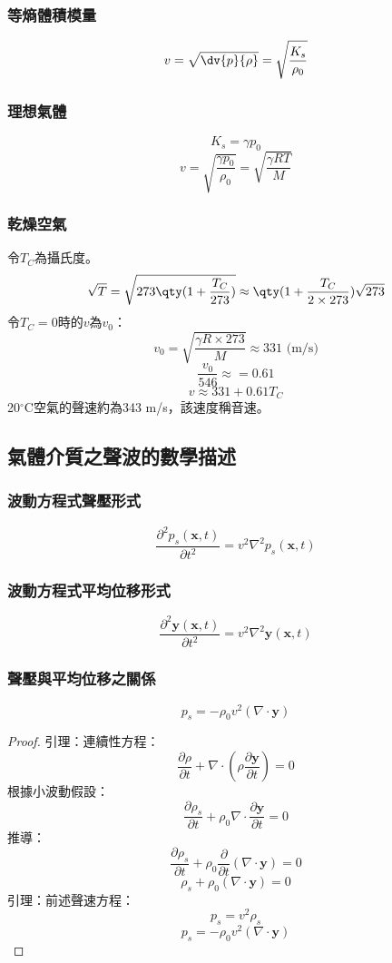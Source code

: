 \documentclass[a4paper,12pt]{report}
\begin{document}
\subsubsection {等熵體積模量}
\[v = \sqrt{\dv{p}{\rho}}=\sqrt{\frac{K_s}{\rho_0}}\]
\subsubsection {理想氣體}
\[K_s=\gamma p_0\]
\[v = \sqrt{\frac{\gamma p_0}{\rho_0}} = \sqrt{\frac{\gamma RT}{M}}\]
\subsubsection {乾燥空氣}
令$T_C$為攝氏度。
\[\sqrt{T}=\sqrt{273\qty(1+\frac{T_C}{273})}\approx \qty(1+\frac{T_C}{2\times 273})\sqrt{273}\]
令$T_C=0$時的$v$為$v_0$：
\[v_0=\sqrt{\frac{\gamma R\times 273}{M}}\approx 331 \text{ (m/s)}\]
\[\frac{v_0}{546}\approx =0.61\]
\[v\approx 331+0.61T_C\]
20$^\circ$C空氣的聲速約為343 m/s，該速度稱音速。
\subsection {氣體介質之聲波的數學描述}
\subsubsection {波動方程式聲壓形式}
\[\frac{\partial^2 p_s(\mathbf{x}, t)}{\partial t^2} = v^2 \nabla^2 p_s(\mathbf{x}, t)\]
\subsubsection {波動方程式平均位移形式}
\[\frac{\partial^2 \mathbf{y}(\mathbf{x}, t)}{\partial t^2} = v^2 \nabla^2 \mathbf{y}(\mathbf{x}, t)\]
\subsubsection {聲壓與平均位移之關係}
\[p_s = -\rho_0 v^2 (\nabla \cdot \mathbf{y})\]
\begin{proof}
引理：連續性方程：
\[\frac{\partial \rho}{\partial t} + \nabla \cdot \left( \rho \frac{\partial\mathbf{y}}{\partial t} \right) = 0\]
根據小波動假設：
\[\frac{\partial \rho_s}{\partial t} + \rho_0 \nabla \cdot \frac{\partial\mathbf{y}}{\partial t} = 0\]
推導：
\[\frac{\partial \rho_s}{\partial t} + \rho_0 \frac{\partial}{\partial t} (\nabla \cdot \mathbf{y}) = 0\]
\[\rho_s + \rho_0 (\nabla \cdot \mathbf{y}) = 0\]
引理：前述聲速方程：
\[p_s = v^2 \rho_s\]
\[p_s = -\rho_0 v^2 (\nabla \cdot \mathbf{y})\]
\end{proof}
\end{document}

